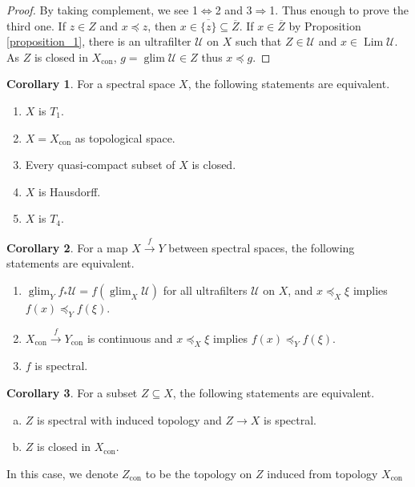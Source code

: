 \documentclass[10pt]{article}
\numberwithin{equation}{section}
\theoremstyle{definition}
\newtheorem{corollary}{Corollary} [subsection]
\DeclareMathOperator{\Lim}{Lim}
\DeclareMathOperator{\glim}{glim}
\DeclareMathOperator{\con}{con}
\newcommand{\U}[0]{\mathcal{U}}
\begin{document}
\begin{proof}
By taking complement, we see 1$\Leftrightarrow$2 and 3$\Rightarrow$1. Thus enough to prove the third one. If $z\in Z$ and $x\preceq z$, then $x\in\overline{\{z\}}\subseteq\overline{Z}$. If $x\in\overline{Z}$ by Proposition \ref{proposition_1}, there is an ultrafilter $\U$ on $X$ such that $Z\in\U$ and $x\in\Lim\U$. As $Z$ is closed in $X_{\con}$, $g=\glim\U\in Z$ thus $x\preceq g$.
\end{proof}
\begin{corollary}
    \label{corollary_6}
    For a spectral space $X$, the following statements are equivalent.
    \begin{enumerate}
        \item $X$ is $T_1$.
        \item $X=X_{\con}$ as topological space.
        \item Every quasi-compact subset of $X$ is closed.
        \item $X$ is Hausdorff.
        \item $X$ is $T_4$.
    \end{enumerate}
\end{corollary}
\begin{corollary}
    \label{corollary_7}
    For a map $X\stackrel{f}{\to}Y$ between spectral spaces, the following statements are equivalent.
    \begin{enumerate}
        \item $\glim_Yf_*\U=f(\glim_X\U)$ for all ultrafilters $\U$ on $X$, and $x\preceq_X \xi$ implies $f(x)\preceq_Y f(\xi)$.
        \item $X_{\con}\stackrel{f}{\to}Y_{\con}$ is continuous and $x\preceq_X\xi$ implies $f(x)\preceq_Yf(\xi)$.
        \item $f$ is spectral.
    \end{enumerate}
\end{corollary}
\begin{corollary}
    \label{corollary_8}
    For a subset $Z\subseteq X$, the following statements are equivalent.
    \begin{enumerate}[a.]
        \item $Z$ is spectral with induced topology and $Z\to X$ is spectral.
        \item $Z$ is closed in $X_{\con}$.
    \end{enumerate}
    In this case, we denote $Z_{\con}$ to be the topology on $Z$ induced from topology $X_{\con}$
\end{corollary}
\end{document}
